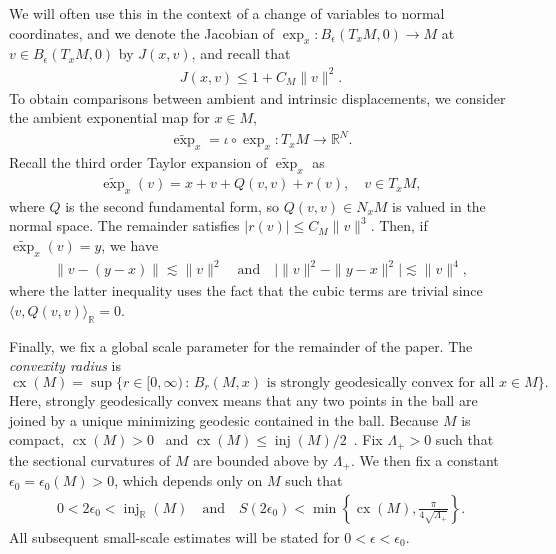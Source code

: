 \documentclass[11pt,reqno]{amsproc}
\numberwithin{equation}{section}
\newcommand{\R}{\mathbb{R}}
\newcommand{\texp}{\widetilde{\exp}}
\newcommand{\ls}{\lesssim}
\newcommand{\inj}{\operatorname{inj}}
\newcommand{\cx}{\operatorname{cx}}
\newcommand{\ball}[3]{B_{#3}(#1, #2)} %
\newcommand{\andd}{\quad \text{and} \quad}
\theoremstyle{definition}
\theoremstyle{plain}
\begin{document}
    We will often use this in the context of a change of variables to normal coordinates, and we denote the Jacobian of $\exp_x : \ball{T_x M}{0}{\epsilon} \to M$ at $v \in \ball{T_x M}{0}{\epsilon}$ by $J(x,v)$, and recall that
    \begin{align} \label{eq:jacobian_remainder}
        J(x,v) \leq 1 + C_M \|v\|^2. 
    \end{align}
    To obtain comparisons between ambient and intrinsic displacements, we consider the ambient exponential map for $x \in M$, 
    \begin{align} 
        \texp_x  = \iota \circ \exp_x : T_x M  \to \R^N.
    \end{align}
    Recall the third order Taylor expansion of $\texp_x$ as~\cite{monera_taylor_2014}
    \begin{align} \label{eq:exp_taylor}
        \texp_x(v) = x + v + Q(v,v) + r(v), \quad v \in T_x M,
    \end{align}
    where $Q$ is the second fundamental form, so $Q(v,v) \in N_x M$ is valued in the normal space. The remainder satisfies $|r(v)| \leq C_M \|v\|^3$. Then, if $\texp_x(v) = y$, we have
    \begin{align} \label{eq:euclidean_intrinsic_comparison}
        \|v - (y-x)\| \ls \|v\|^2 \andd \big|\|v\|^2-\|y-x\|^2\big| \ls \|v\|^4,
    \end{align}
    where the latter inequality uses the fact that the cubic terms are trivial since $\langle v, Q(v,v) \rangle_\R = 0$. \medskip

    Finally, we fix a global scale parameter for the remainder of the paper. The \emph{convexity radius} is
    \begin{equation} \label{eq:convexity_radius}
        \cx(M) = \sup \{ r \in [0, \infty) \, : \, \ball{M}{x}{r} \text{ is strongly geodesically convex for all } x \in M \}.
    \end{equation}
    Here, strongly geodesically convex means that any two points in the ball are joined by a unique minimizing geodesic contained in the ball. Because $M$ is compact, $\cx(M)>0$~\cite[Section 6.4.2]{petersen_riemannian_2016} and $\cx(M)\leq \inj(M)/2$~\cite{dibble_convexity_2017}. Fix $\Lambda_+>0$ such that the sectional curvatures of $M$ are bounded above by $\Lambda_+$. We then fix a constant $\epsilon_0=\epsilon_0(M)>0$, which depends only on $M$ such that
    \begin{align} \label{eq:global_epsilon_0}
        0<2\epsilon_0<\inj_\R(M) \andd S(2\epsilon_0)<\min\left\{\cx(M),\frac{\pi}{4\sqrt{\Lambda_+}}\right\}.
    \end{align}
    \label{not:global_small_scale}
    All subsequent small-scale estimates will be stated for $0<\epsilon<\epsilon_0$.
\end{document}
